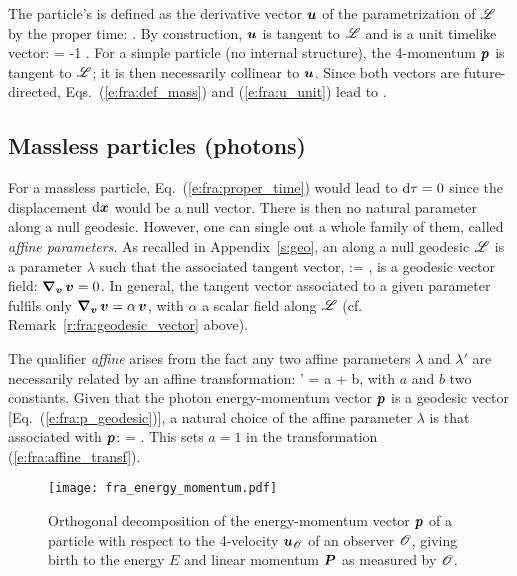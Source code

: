 The particle's  is defined as the
derivative vector $\bm{u}$ of the parametrization of
$\mathscr{L}$ by the proper time:
\be \label{e:fra:def_u}
    .
\ee
By construction, $\bm{u}$ is tangent to $\mathscr{L}$ and is a unit timelike vector:
\be \label{e:fra:u_unit}
    \cdot{} = -1 .
\ee
For a simple particle (no internal structure),
the 4-momentum $\bm{p}$ is tangent to $\mathscr{L}$; it is then necessarily
collinear to $\bm{u}$. Since both vectors are future-directed,
Eqs.~(\ref{e:fra:def_mass}) and (\ref{e:fra:u_unit}) lead to
\be \label{e:fra:p_m_u}
   .
\ee

\subsection{Massless particles (photons)}

For a massless particle, Eq.~(\ref{e:fra:proper_time}) would lead to $\mathrm{d}\tau=0$
since the displacement $\mathrm{d}\bm{x}$ would be a null vector. There is then no natural parameter
along a null geodesic. However, one can single out a whole family of them,
called \emph{affine parameters}.
As recalled in Appendix~\ref{s:geo},
an 
along a null geodesic $\mathscr{L}$ is a parameter $\lambda$ such that
the associated tangent vector,
\be
     :=  ,
\ee
is a geodesic vector field: $\bm{\nabla}_{\bm{v}} \, \bm{v} = 0$. In general,
the tangent vector associated to a given parameter fulfils only
$\bm{\nabla}_{\bm{v}} \, \bm{v} = \alpha \, \bm{v}$, with $\alpha$ a scalar field
along $\mathscr{L}$ (cf. Remark~\ref{r:fra:geodesic_vector} above).

The qualifier \emph{affine} arises from the fact any two affine parameters
$\lambda$ and $\lambda'$ are necessarily related by an affine transformation:
\be \label{e:fra:affine_transf}
    \lambda' = a \lambda + b,
\ee
with $a$ and $b$ two constants.
Given that the photon energy-momentum vector $\bm{p}$ is a geodesic vector
[Eq.~(\ref{e:fra:p_geodesic})],
a natural choice of the affine parameter $\lambda$ is that associated with
$\bm{p}$:
\be \label{e:fra:p_dxdl}
     =  .
\ee
This sets $a=1$ in the transformation (\ref{e:fra:affine_transf}).


\begin{figure}
\centerline{\texttt{[image: fra\_energy\_momentum.pdf]}}
\caption[]{\label{f:fra:energy_momentum} \footnotesize
Orthogonal decomposition of the energy-momentum vector $\bm{p}$ of a particle
with respect to the 4-velocity $\bm{u}_{\mathscr{O}}$ of an observer $\mathscr{O}$,
giving birth to the energy $E$ and linear momentum $\bm{P}$ as measured by $\mathscr{O}$.}
\end{figure}



